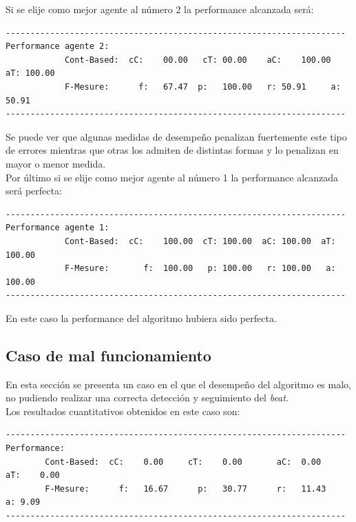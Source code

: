 \documentclass[12pt,a4paper,titlepage]{report}
\begin{document}
Si se elije como mejor agente al número 2 la performance alcanzada será:
\begin{verbatim}
---------------------------------------------------------------------
Performance agente 2:
        	Cont-Based:	 cC:	00.00	cT:	00.00	 aC:	100.00	aT:	100.00
        	F-Mesure: 	   f:	67.47  p:	100.00	 r:	50.91	  a:	50.91
---------------------------------------------------------------------
\end{verbatim}
Se puede ver que algunas medidas de desempeño penalizan fuertemente este tipo de errores mientras que otras los admiten de distintas formas y lo penalizan en mayor o menor medida.\\

Por último si se elije como mejor agente al número 1 la performance alcanzada será perfecta:
\begin{verbatim}
---------------------------------------------------------------------
Performance agente 1:
        	Cont-Based:	 cC:	100.00	cT:	100.00	aC:	100.00	aT:	100.00
        	F-Mesure:	    f:	100.00	 p:	100.00	 r:	100.00	 a:	100.00
---------------------------------------------------------------------
\end{verbatim}

En este caso la performance del algoritmo hubiera sido perfecta.

\subsection{Caso de mal funcionamiento}

En esta sección se presenta un caso en el que el desempeño del algoritmo es malo, no pudiendo realizar una correcta detección y seguimiento del \emph{beat}.\\

Los resultados cuantitativos obtenidos en este caso son:

\begin{verbatim}
---------------------------------------------------------------------
Performance:
        Cont-Based:	 cC:	0.00 	 cT:	0.00	   aC:	0.00  	 aT:	0.00
        F-Mesure:	   f:	16.67	   p:	30.77	   r:	11.43  	 a:	9.09
---------------------------------------------------------------------
\end{verbatim}
\end{document}
